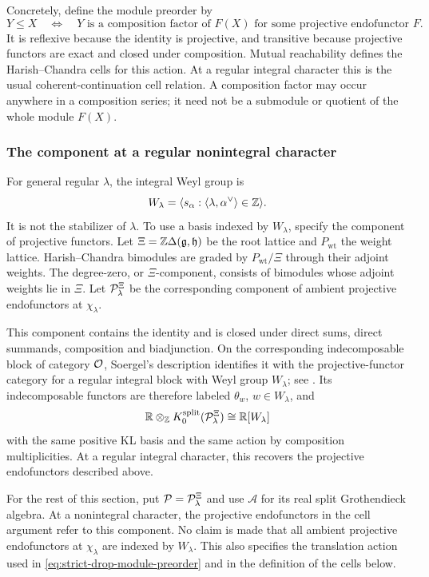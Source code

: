 Concretely, define the module preorder by
\begin{equation}\label{eq:strict-drop-module-preorder}
  Y\leq X\quad\Longleftrightarrow\quad
  Y\text{ is a composition factor of }F(X)
  \text{ for some projective endofunctor }F.
\end{equation}
It is reflexive because the identity is projective, and transitive because
projective functors are exact and closed under composition. Mutual
reachability defines the Harish--Chandra cells for this action. At a
regular integral character this is the usual coherent-continuation cell
relation. A composition factor may occur anywhere in a composition
series; it need not be a submodule or quotient of the whole module $F(X)$.

\subsubsection{The component at a regular nonintegral character}
\label{subsubsec:strict-drop-nonintegral-component}

For general regular $\lambda$, the integral Weyl group is
\[
  W_\lambda=\langle s_\alpha:
       \langle\lambda,\alpha^\vee\rangle\in\mathbb{Z}\rangle.
\]
It is not the stabilizer of $\lambda$. To use a basis indexed by
$W_\lambda$, specify the component of projective functors. Let
$\Xi=\mathbb{Z}\Delta(\mathfrak{g},\mathfrak{h})$ be the root lattice and $P_{\mathrm{wt}}$ the
weight lattice. Harish--Chandra bimodules are graded by
$P_{\mathrm{wt}}/\Xi$ through their adjoint weights. The degree-zero, or
$\Xi$-component, consists of bimodules whose adjoint weights lie in $\Xi$.
Let $\mathcal{P}_\lambda^\Xi$ be the corresponding component of ambient projective
endofunctors at $\chi_\lambda$.

This component contains the identity and is closed under direct sums,
direct summands, composition and biadjunction. On the corresponding
indecomposable block of category $\mathcal{O}$, Soergel's description identifies
it with the projective-functor category for a regular integral block with
Weyl group $W_\lambda$; see
\cite[\S\S2.3--2.4]{MackaayMazorchukMiemietz2024}. Its indecomposable
functors are therefore labeled $\theta_w$, $w\in W_\lambda$, and
\[
  \mathbb{R}\otimes_{\mathbb{Z}} K_0^{\mathrm{split}}(\mathcal{P}_\lambda^\Xi)
  \cong\mathbb{R}[W_\lambda]
\]
with the same positive KL basis and the same action by composition
multiplicities. At a regular integral character, this recovers the
projective endofunctors described above.

For the rest of this section, put $\mathcal{P}=\mathcal{P}_\lambda^\Xi$ and use
$\mathcal A$ for its real split Grothendieck algebra. At a nonintegral
character, the projective endofunctors in the cell argument refer to this
component. No claim is made that all ambient projective endofunctors at
$\chi_\lambda$ are indexed by $W_\lambda$. This also specifies the
translation action used in \eqref{eq:strict-drop-module-preorder} and in
the definition of the cells below.

